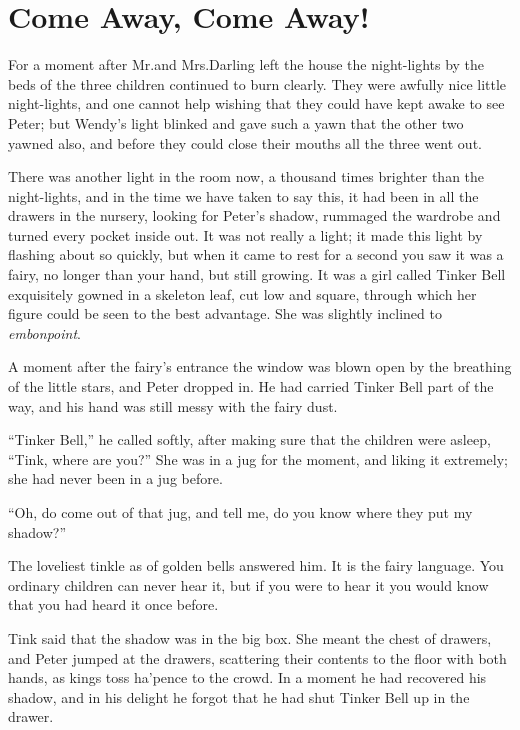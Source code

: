 
\chapter{Come Away, Come Away!}

For a moment after Mr.\@ and Mrs.\@ Darling left the house
the night-lights by the beds of the three children continued to burn clearly.
They were awfully nice little night-lights,
and one cannot help wishing that they could have kept awake to see Peter;
but Wendy’s light blinked and gave such a yawn that the other two yawned also,
and before they could close their mouths all the three went out.

There was another light in the room now, a thousand times brighter than the night-lights,
and in the time we have taken to say this, it had been in all the drawers in the nursery,
looking for Peter’s shadow, rummaged the wardrobe and turned every pocket inside out.
It was not really a light;
it made this light by flashing about so quickly,
but when it came to rest for a second you saw it was a fairy, no longer than your hand, but still growing.
It was a girl called Tinker Bell exquisitely gowned in a skeleton leaf, cut low and square,
through which her figure could be seen to the best advantage.
She was slightly inclined to \emph{embonpoint}.

A moment after the fairy’s entrance the window was blown open by the breathing of the little stars,
and Peter dropped in.
He had carried Tinker Bell part of the way, and his hand was still messy with the fairy dust.

“Tinker Bell,” he called softly, after making sure that the children were asleep,
“Tink, where are you?”
She was in a jug for the moment, and liking it extremely;
she had never been in a jug before.

“Oh, do come out of that jug, and tell me, do you know where they put my shadow?”

The loveliest tinkle as of golden bells answered him.
It is the fairy language.
You ordinary children can never hear it,
but if you were to hear it you would know that you had heard it once before.

Tink said that the shadow was in the big box.
She meant the chest of drawers, and Peter jumped at the drawers,
scattering their contents to the floor with both hands, as kings toss ha’pence to the crowd.
In a moment he had recovered his shadow,
and in his delight he forgot that he had shut Tinker Bell up in the drawer.

